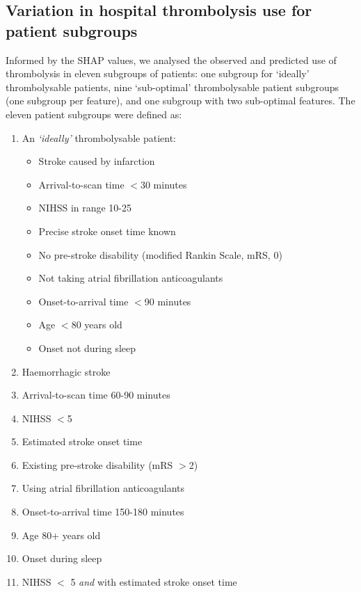 
\subsection{Variation in hospital thrombolysis use for patient subgroups}

Informed by the SHAP values, we analysed the observed and predicted use of thrombolysis in eleven subgroups of patients: one subgroup for `ideally' thrombolysable patients, nine `sub-optimal' thrombolysable patient subgroups (one subgroup per feature), and one subgroup with two sub-optimal features. The eleven patient subgroups were defined as:

\begin{enumerate}
  \item An \emph{`ideally'} thrombolysable patient:
  \begin{itemize}
    \setlength\itemsep{-2mm}
    \item Stroke caused by infarction
    \item Arrival-to-scan time $<$30 minutes
    \item NIHSS in range 10-25
    \item Precise stroke onset time known
    \item No pre-stroke disability (modified Rankin Scale, mRS, 0)
    \item Not taking atrial fibrillation anticoagulants
    \item Onset-to-arrival time $<$90 minutes
    \item Age $<$80 years old
    \item Onset not during sleep
  \end{itemize}
  \item Haemorrhagic stroke
  \item Arrival-to-scan time 60-90 minutes
  \item NIHSS $<$5
  \item Estimated stroke onset time
  \item Existing pre-stroke disability (mRS $>$2)
  \item Using atrial fibrillation anticoagulants
  \item Onset-to-arrival time 150-180 minutes
  \item Age 80+ years old
  \item Onset during sleep
  \item NIHSS $<$ 5 \emph{and} with estimated stroke onset time
\end{enumerate}

